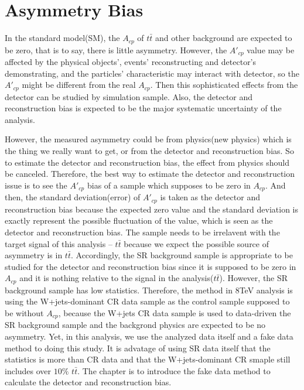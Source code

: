 

\section{Asymmetry Bias}
\label{sec:AsymBias}

	In the standard model(SM), the $A_{cp}$ of $t\bar{t}$ and other background are expected to be zero, that is to say, there is little asymmetry. However, the $A'_{cp}$ value may be affected by the physical objects', events' reconstructing and detector's demonstrating, and the particles' characteristic may interact with detector, so the $A'_{cp}$ might be different from the real $A_{cp}$. Then this sophisticated effects from the detector can be studied by simulation sample. Also, the detector and reconstruction bias is expected to be the major systematic uncertainty of the analysis.

	However, the measured asymmetry could be from physics(new physics) which is the thing we really want to get, or from the detector and reconstruction bias. So to estimate the detector and reconstruction bias, the effect from physics should be canceled. Therefore, the best way to estimate the detector and reconstruction issue is to see the $A'_{cp}$ bias of a sample which supposes to be zero in $A_{cp}$. And then, the standard deviation(error) of $A'_{cp}$ is taken as the detector and reconstruction bias because the expected zero value and the standard deviation is exactly represent the possible fluctuation of the value, which is seen as the detector and reconstruction bias. The sample needs to be irrelavent with the target signal of this analysis -- $t\bar{t}$ because we expect the possible source of asymmetry is in $t\bar{t}$. Accordingly, the SR background sample is appropriate to be studied for the detector and reconstruction bias since it is supposed to be zero in $A_{cp}$ and it is nothing relative to the signal in the analysis($t\bar{t}$). However, the SR background sample has low statistics. Therefore, the method in 8TeV analysis is using the W+jets-dominant CR data sample as the control sample supposed to be without $A_{cp}$, because the W+jets CR data sample is used to data-driven the SR background sample and the backgrond physics are expected to be no asymmetry. Yet, in this analysis, we use the analyzed data itself and a fake data method to doing this study. It is advatage of using SR data itself that the statistics is more than CR data and that the W+jets-dominant CR smaple still includes over $10\%$ $t\bar{t}$. The chapter is to introduce the fake data method to calculate the detector and reconstruction bias.


